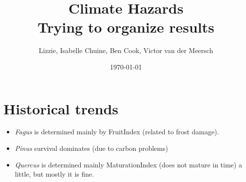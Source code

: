 \documentclass[11pt,letter]{article}
\begin{document}

\renewcommand{\refname}{\CHead{}}

\setlength{\parindent}{0cm}
\setlength{\parskip}{5pt}

\title{Climate Hazards \\ Trying to organize results}
\author{Lizzie, Isabelle Chuine, Ben Cook, Victor van der Meersch}
\date{\today}
\maketitle
\tableofcontents

\section{Historical trends}

\begin{itemize}
\item \emph{Fagus} is determined mainly by FruitIndex (related to frost damage). 
\item \emph{Pinus} survival dominates (due to carbon problems) 
\item \emph{Quercus} is determined mainly MaturationIndex (does not mature in time) a little, but mostly it is fine. 
\end{itemize}
\end{document}
